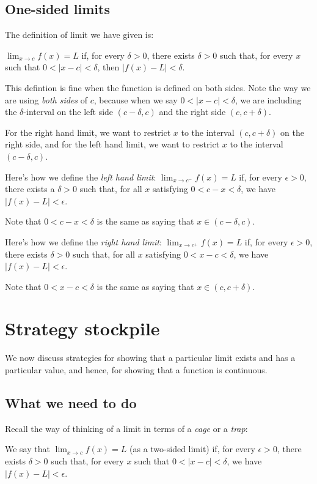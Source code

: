 \documentclass[10pt]{amsart}
\begin{document}
\subsection{One-sided limits}

The definition of limit we have given is:

$\lim_{x \to c} f(x) = L$ if, for every $\delta > 0$, there exists
$\delta > 0$ such that, for every $x$ such that $0 < |x - c| <
\delta$, then $|f(x) - L| < \delta$.

This defintion is fine when the function is defined on both
sides. Note the way we are using {\em both sides} of $c$, because when
we say $0 < |x - c| < \delta$, we are including the
$\delta$-interval on the left side $(c - \delta,c)$ and the right
side $(c, c+\delta)$.

For the right hand limit, we want to restrict $x$ to the interval
$(c,c + \delta)$ on the right side, and for the left hand limit, we
want to restrict $x$ to the interval $(c - \delta,c)$.

Here's how we define the {\em left hand limit}: $\lim_{x \to
c^-} f(x) = L$ if, for every $\epsilon > 0$, there exists a $\delta >
0$ such that, for all $x$ satisfying $0 < c - x < \delta$, we have
$|f(x) - L| < \epsilon$.

Note that $0 < c - x < \delta$ is the same as saying that $x \in (c -
\delta,c)$.

Here's how we define the {\em right hand limit}: $\lim_{x \to c^+}
f(x) = L$ if, for every $\epsilon > 0$, there exists $\delta > 0$ such
that, for all $x$ satisfying $0 < x - c < \delta$, we have $|f(x) - L|
< \epsilon$.

Note that $0 < x - c < \delta$ is the same as saying that $x \in (c,c
+ \delta)$.

\section{Strategy stockpile}

We now discuss strategies for showing that a particular limit exists
and has a particular value, and hence, for showing that a function is
continuous.
\subsection{What we need to do}

Recall the way of thinking of a limit in terms of a {\em cage} or a
{\em trap}:

We say that $\lim_{x \to c} f(x) = L$ (as a two-sided limit) if, for
every $\epsilon > 0$, there exists $\delta > 0$ such that, for every
$x$ such that $0 < |x - c| < \delta$, we have $|f(x) - L| < \epsilon$.
\end{document}
